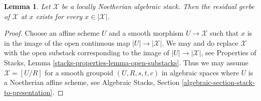 \documentclass{stacks-project}
\theoremstyle{plain}
\newtheorem{lemma}[subsection]{Lemma}
\theoremstyle{definition}
\theoremstyle{remark}
\numberwithin{equation}{subsection}
\begin{document}
\begin{lemma}
\label{lemma-every-point-residual-gerbe-locally-Noetherian}
Let $\mathcal{X}$ be a locally Noetherian algebraic stack.
Then the residual gerbe of $\mathcal{X}$ at $x$ exists for
every $x \in |\mathcal{X}|$.
\end{lemma}

\begin{proof}
Choose an affine scheme $U$ and a smooth morphism $U \to \mathcal{X}$
such that $x$ is in the image of the open continuous map
$|U| \to |\mathcal{X}|$. We may and do replace $\mathcal{X}$
with the open substack corresponding to the image of $|U| \to |\mathcal{X}|$,
see Properties of Stacks, Lemma \ref{stacks-properties-lemma-open-substacks}.
Thus we may assume $\mathcal{X} = [U/R]$ for a smooth
groupoid $(U, R, s, t, c)$ in algebraic spaces
where $U$ is a Noetherian affine scheme, see
Algebraic Stacks, Section \ref{algebraic-section-stack-to-presentation}.


\end{proof}
\end{document}
